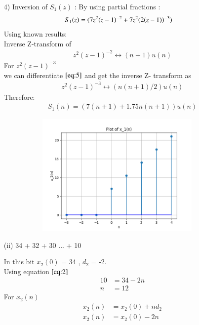 \documentclass[journal,12pt,twocolumn]{IEEEtran}
\theoremstyle{remark}
\begin{document}
\begin{enumerate}
    \item[4)]
Inversion of $S_1(z)$ :
By using partial fractions :
\begin{align}
    S_1(z) &= \notag(7z^2(z-1)^{-2} + 7z^2(2(z-1))^{-3}) 
\end{align}
Using known results:\\
  Inverse Z-transform of
\begin{align}
        z^2(z-1)^{-2} \leftrightarrow (n+1)u(n)\label{eq:5}
\end{align}
    For $z^2(z-1)^{-3}$\\
    
    we can differentiate $\eqref{eq:5}$ and get the inverse Z- transform as 
    \begin{align}
          z^2(z-1)^{-3} \leftrightarrow (n(n+1)/2)u(n) \label{eq:7}
    \end{align}
    Therefore:
\begin{align}
 S_1(n) = (7(n+1) + 1.75n(n+1))u(n)
\end{align}
    \begin{figure}[!ht]
    \centering
\graphicspath{ {figs/} }
\includegraphics[width=10cm, height=6cm]{graph_1}
\captionsetup{Graph:1 $x_1(n)$ vs n }
\end{figure}
    











\vspace{0.5cm}
\item[(ii)]
 34 + 32 + 30 ... + 10
\vspace{0.2cm}

In this bit  $x_2(0)$ = 34 , $d_2$ = -2.\\

Using equation $\eqref{eq:2}$
\begin{align}
     10 &= 34 -2n\\
     n &= 12 
     \end{align}
For $x_2(n)$
\begin{align}
x_2(n) &= x_2(0) + nd_2\\
x_2(n) &= x_2(0) -2n
\end{align}



\end{enumerate}
\end{document}

